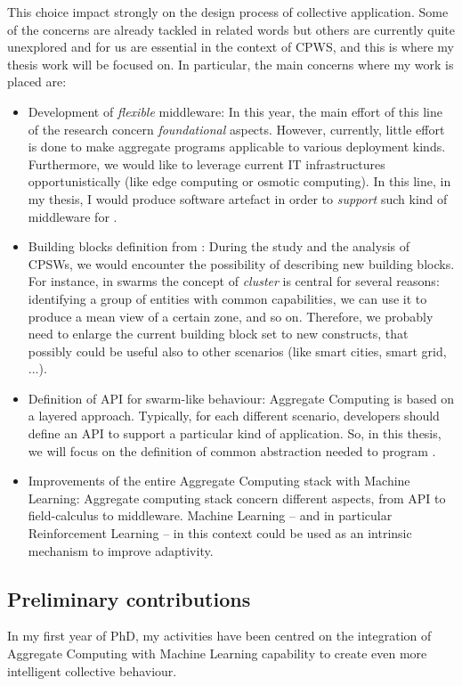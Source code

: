 \documentclass[11pt]{article}
\begin{document}
This choice impact strongly on the design process of collective application. Some of the concerns are already tackled in related words but others are currently quite unexplored and for us are essential in the context of CPWS, and this is where my thesis work will be focused on.
In particular, the main concerns where my work is placed are:
\begin{itemize}
	\item Development of \textit{flexible} middleware: In this year, the main effort of this line of the research concern \textit{foundational} aspects. However, currently, little effort is done to make aggregate programs applicable to various deployment kinds. Furthermore, we would like to leverage current IT infrastructures opportunistically (like edge computing or osmotic computing). In this line, in my thesis, I would produce software artefact in order to \textit{support} such kind of middleware for \cpws.
	\item Building blocks definition from \cpws: During the study and the analysis of CPSWs, we would encounter the possibility of describing new building blocks. For instance, in swarms the concept of \emph{cluster} is central for several reasons: identifying a group of entities with common capabilities, we can use it to produce a mean view of a certain zone, and so on. Therefore, we probably need to enlarge the current building block set to new constructs, that possibly could be useful also to other scenarios (like smart cities, smart grid, ...).
	\item Definition of API for swarm-like behaviour: Aggregate Computing is based on a layered approach. Typically, for each different scenario, developers should define an API to support a particular kind of application. So, in this thesis, we will focus on the definition of common abstraction needed to program \cpws.
	\item Improvements of the entire Aggregate Computing stack with Machine Learning: Aggregate computing stack concern different aspects, from API to field-calculus to middleware. Machine Learning -- and in particular Reinforcement Learning -- in this context could be used as an intrinsic mechanism to improve adaptivity.
\end{itemize}

\subsection{Preliminary contributions}
In my first year of PhD, my activities have been centred on
the integration of Aggregate Computing with Machine Learning capability to create even more
intelligent collective behaviour. 
\end{document}
